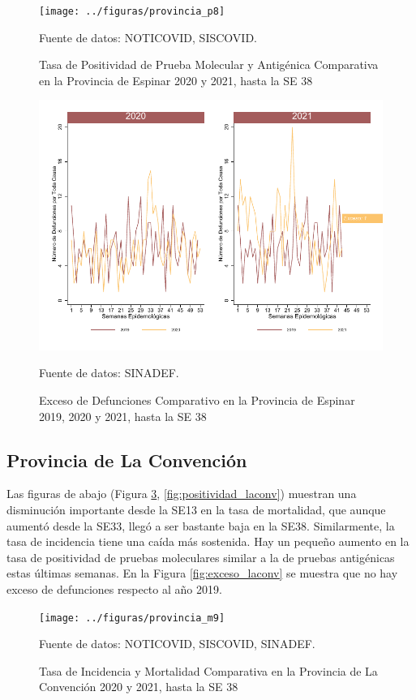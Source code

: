 \documentclass[12pt,a4paper,openany]{book}
\begin{document}
	\begin{figure}[h]
	\caption{Tasa de Positividad de Prueba Molecular y Antigénica Comparativa en la Provincia de Espinar 2020 y 2021, hasta la SE 38}\label{fig:positividad_espinar}
	\begin{center}
		\texttt{[image: ../figuras/provincia\_p8]}
	\end{center}
	{\footnotesize {Fuente de datos: NOTICOVID, SISCOVID.}}
	\end{figure}

	\begin{figure}[h]
	\caption{Exceso de Defunciones Comparativo en la Provincia de Espinar 2019, 2020 y 2021, hasta la SE 38}\label{fig:exceso_espinar}
	\begin{center}
		\includegraphics[width=0.7\linewidth]{../figuras/exceso_8}
	\end{center}
	{\footnotesize {Fuente de datos: SINADEF.}}
	\end{figure}

\clearpage

	\subsection*{Provincia de La Convención}
	\noindent Las figuras de abajo (Figura \ref{fig:inc_mort_laconv}, \ref{fig:positividad_laconv})  muestran una disminución importante desde la SE13 en la tasa de mortalidad, que aunque aumentó desde la SE33, llegó a ser bastante baja en la SE38. Similarmente, la tasa de incidencia tiene una caída más sostenida. Hay un pequeño aumento en la tasa de positividad de pruebas moleculares similar a la de pruebas antigénicas estas últimas semanas. En la Figura \ref{fig:exceso_laconv} se muestra que no hay exceso de defunciones respecto al año 2019.

	\begin{figure}[h]
	\caption{Tasa de Incidencia y Mortalidad Comparativa en la Provincia de La Convención 2020 y 2021, hasta la SE 38}\label{fig:inc_mort_laconv}
	\begin{center}
		\texttt{[image: ../figuras/provincia\_m9]}
	\end{center}
	{\footnotesize {Fuente de datos: NOTICOVID, SISCOVID, SINADEF.}}
	\end{figure}
\end{document}
